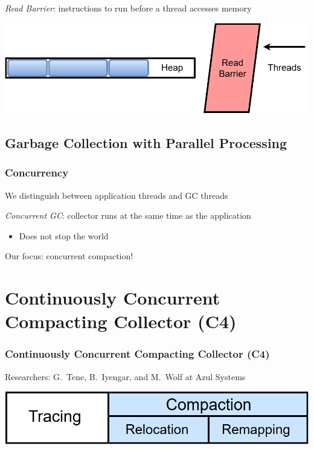 \documentclass{beamer}
\newcommand{\linespace}{\vskip 0.25cm}
\begin{document}
\begin{frame}
{%
\emph{Read Barrier}: instructions to run before a thread accesses memory

\linespace
\linespace
\linespace

\begin{center}
\includegraphics[width=.70\textwidth]{Illustrations/read_barrier.png}
\end{center}

}

\end{frame}



\subsection[GC with PP]{Garbage Collection with Parallel Processing}

\begin{frame}

\frametitle{Concurrency}

We distinguish between application threads and GC threads

\linespace
\linespace

\emph{Concurrent GC}: collector runs at the same time as the application
\begin{itemize}
\item Does not stop the world
\end{itemize}

\linespace
\linespace

Our focus: concurrent compaction!

\end{frame}



\section[C4]{Continuously Concurrent Compacting Collector (C4)}

\begin{frame}

\frametitle{Continuously Concurrent Compacting Collector (C4)}

Researchers: G.~Tene, B.~Iyengar, and M.~Wolf at Azul Systems

\linespace
\linespace
\linespace
\linespace

\begin{center}
\includegraphics[width=.85\textwidth]{Illustrations/gc_cycle_locator_compaction.png}
\end{center}

\end{frame}
\end{document}
